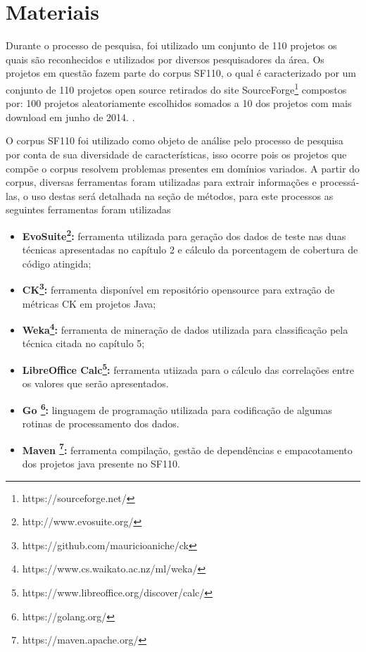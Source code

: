 \documentclass[
	12pt,				%
	oneside,			%
	a4paper,			%
	english,			%
	brazil				%
	]{abntex2ppgsi}
\begin{document}
\section{Materiais}

Durante o processo de pesquisa, foi utilizado um conjunto de 110 projetos os quais são reconhecidos e utilizados por diversos pesquisadores da área. Os projetos em questão fazem parte do corpus SF110, o qual é caracterizado por um conjunto de 110 projetos open source retirados do site SourceForge\footnote{https://sourceforge.net/} compostos por: 100 projetos aleatoriamente escolhidos somados a  10 dos projetos com mais download em junho de 2014. \cite{shamriski20151115}.

O corpus SF110 foi utilizado como objeto de análise pelo processo de pesquisa por conta de sua diversidade de características, isso ocorre pois os projetos que compõe o corpus resolvem problemas presentes em domínios variados.  A partir do corpus, diversas ferramentas foram utilizadas para extrair informações e processá-las, o uso destas será detalhada na seção de métodos, para este processos as seguintes ferramentas foram utilizadas 



\begin{itemize}
  \item \textbf{EvoSuite\footnote{http://www.evosuite.org/}:} ferramenta utilizada para geração dos dados de teste nas duas técnicas apresentadas no capítulo 2 e cálculo da porcentagem de cobertura de código atingida;
  \item \textbf{CK\footnote{https://github.com/mauricioaniche/ck}:} ferramenta disponível em repositório opensource para extração de métricas CK em projetos Java;
  \item \textbf{Weka\footnote{https://www.cs.waikato.ac.nz/ml/weka/}:} ferramenta de mineração de dados utilizada para classificação pela técnica citada no capítulo 5;
  \item \textbf{LibreOffice Calc\footnote{https://www.libreoffice.org/discover/calc/}:} ferramenta utiizada para o cálculo das correlações entre os valores que serão apresentados.
  \item \textbf{Go \footnote{https://golang.org/}:} linguagem de programação utilizada para codificação de algumas rotinas de processamento dos dados.
  \item \textbf{Maven \footnote{https://maven.apache.org/}:} ferramenta compilação, gestão de dependências e empacotamento dos projetos java presente no SF110.
\end{itemize}
\end{document}
